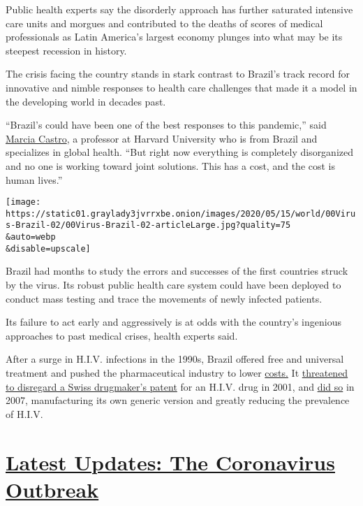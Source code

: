 Public health experts say the disorderly approach has further saturated
intensive care units and morgues and contributed to the deaths of scores
of medical professionals as Latin America's largest economy plunges into
what may be its steepest recession in history.

The crisis facing the country stands in stark contrast to Brazil's track
record for innovative and nimble responses to health care challenges
that made it a model in the developing world in decades past.

``Brazil's could have been one of the best responses to this pandemic,''
said \href{https://www.hsph.harvard.edu/marcia-castro/}{Marcia Castro},
a professor at Harvard University who is from Brazil and specializes in
global health. ``But right now everything is completely disorganized and
no one is working toward joint solutions. This has a cost, and the cost
is human lives.''

\texttt{[image: https://static01.graylady3jvrrxbe.onion/images/2020/05/15/world/00Virus-Brazil-02/00Virus-Brazil-02-articleLarge.jpg?quality=75\\\&auto=webp\\\&disable=upscale]}

Brazil had months to study the errors and successes of the first
countries struck by the virus. Its robust public health care system
could have been deployed to conduct mass testing and trace the movements
of newly infected patients.

Its failure to act early and aggressively is at odds with the country's
ingenious approaches to past medical crises, health experts said.

After a surge in H.I.V. infections in the 1990s, Brazil offered free and
universal treatment and pushed the pharmaceutical industry to lower
\href{https://www.ncbi.nlm.nih.gov/pmc/articles/PMC2094169/}{costs.} It
\href{https://www.nytimes3xbfgragh.onion/2001/08/23/business/brazil-will-defy-patent-on-aids-drug-made-by-roche.html}{threatened
to disregard a Swiss drugmaker's patent} for an H.I.V. drug in 2001, and
\href{https://www.ft.com/content/c7d3f1f4-fa78-11db-8bd0-000b5df10621}{did
so} in 2007, manufacturing its own generic version and greatly reducing
the prevalence of H.I.V.

\hypertarget{latest-updates-the-coronavirus-outbreak}{%
\section{\texorpdfstring{\href{https://www.nytimes3xbfgragh.onion/2020/08/21/world/covid-19-coronavirus.html?action=click\&pgtype=Article\&state=default\&region=MAIN_CONTENT_1\&context=storylines_live_updates}{Latest
Updates: The Coronavirus
Outbreak}}{Latest Updates: The Coronavirus Outbreak}}\label{latest-updates-the-coronavirus-outbreak}}

